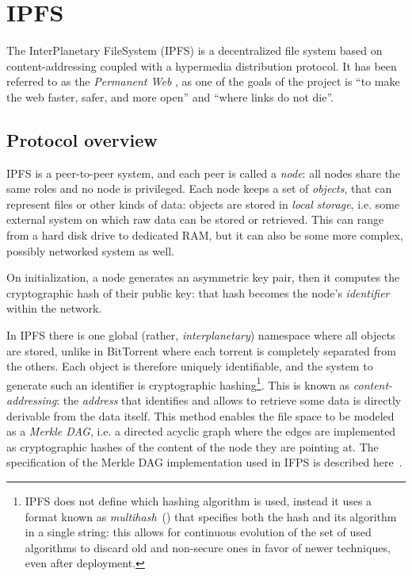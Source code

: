 \documentclass[mscthesis]{usiinfthesis}
\begin{document}
\section{IPFS}\label{proj:ipfs}

The InterPlanetary FileSystem (IPFS) is a decentralized file system based on content-addressing coupled with a hypermedia distribution protocol. It has been referred to as the \textit{Permanent Web} %
, as one of the goals of the project is ``to make the web faster, safer, and more open'' and ``where links do not die''. %

\subsection{Protocol overview}

IPFS is a peer-to-peer system, and each peer is called a \emph{node}: all nodes share the same roles and no node is privileged. Each node keeps a set of \emph{objects}, that can represent files or other kinds of data: objects are stored in \emph{local storage}, i.e. some external system on which raw data can be stored or retrieved. This can range from a hard disk drive to dedicated RAM, but it can also be some more complex, possibly networked system as well.

On initialization, a node generates an asymmetric key pair, then it computes the cryptographic hash of their public key: that hash becomes the node's \emph{identifier} within the network.

In IPFS there is one global (rather, \textit{interplanetary}) namespace where all objects are stored, unlike in BitTorrent where each torrent is completely separated from the others. Each object is therefore uniquely identifiable, and the system to generate such an identifier is cryptographic hashing\footnote{IPFS does not define which hashing algorithm is used, instead it uses a format known as \emph{multihash}~(\cite{multihash}) that specifies both the hash and its algorithm in a single string: this allows for continuous evolution of the set of used algorithms to discard old and non-secure ones in favor of newer techniques, even after deployment.}. This is known as \emph{content-addressing}: the \textit{address} that identifies and allows to retrieve some data is directly derivable from the data itself. This method enables the file space to be modeled as a \textit{Merkle DAG}, i.e. a directed acyclic graph where the edges are implemented as cryptographic hashes of the content of the node they are pointing at. The specification of the Merkle DAG implementation used in IFPS is described here~\cite{website:ipfsmerkledag}.
\end{document}
